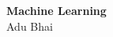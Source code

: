 \begin{titlepage}
    \begin{center}
        \vspace*{1cm}
            
        \Huge
        \textbf{Machine Learning}    \\      
        \small        
        Adu Bhai
        
        \date{\today}      
            
    \end{center}
\end{titlepage}

